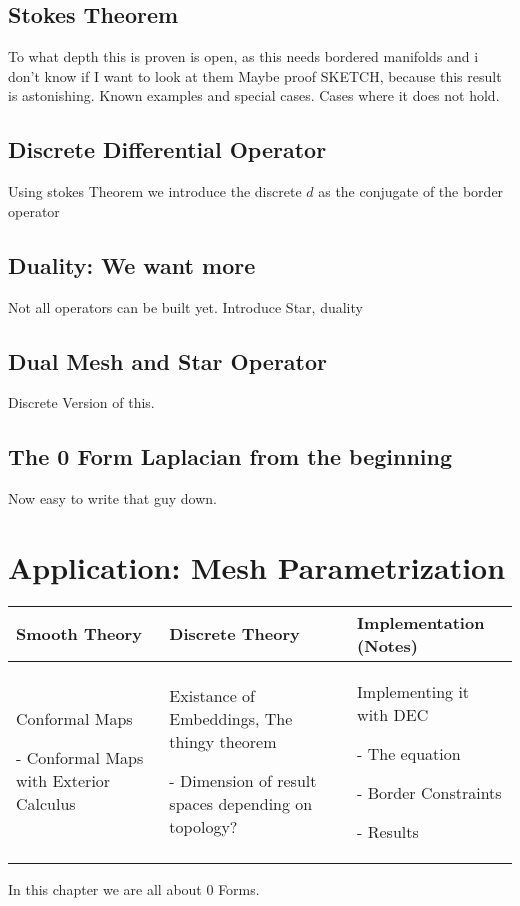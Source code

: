 \documentclass{scrartcl}
\newenvironment{packed_enum}{
\begin{enumerate}
  \setlength{\itemsep}{1pt}
  \setlength{\parskip}{0pt}
  \setlength{\parsep}{0pt}
}{\end{enumerate}}
\begin{document}
	\subsection{Stokes Theorem}
		To what depth this is proven is open, as this needs bordered manifolds and i don't know if I want to look at them
		Maybe proof SKETCH, because this result is astonishing.
		Known examples and special cases. Cases where it does not hold.
	\subsection{Discrete Differential Operator}
		Using stokes Theorem we introduce the discrete $d$ as the conjugate of the border operator
	\subsection{Duality: We want more}
		Not all operators can be built yet. Introduce Star, duality
	\subsection{Dual Mesh and Star Operator}
		Discrete Version of this.
	\subsection{The 0 Form Laplacian from the beginning}
		Now easy to write that guy down.
\newpage		
\section{Application: Mesh Parametrization}
	\begin{longtable}{|p{4.5cm}|p{4.5cm}|p{4.5cm}|}
		\hline
		Smooth Theory& Discrete Theory& Implementation (Notes)\\
		\hline
			Conformal Maps
			\begin{packed_enum}
				\item[-] Conformal Maps with Exterior Calculus
			\end{packed_enum}
			&
			Existance of Embeddings, The thingy theorem
			\begin{packed_enum}
				\item[-] Dimension of result spaces depending on topology?
			\end{packed_enum}
			 & 
			 Implementing it with DEC
			 \begin{packed_enum}
				\item[-] The equation
				\item[-] Border Constraints
				\item[-] Results
			\end{packed_enum}
			 \\		
		\hline
	\end{longtable}
	In this chapter we are all about 0 Forms.
\end{document}
